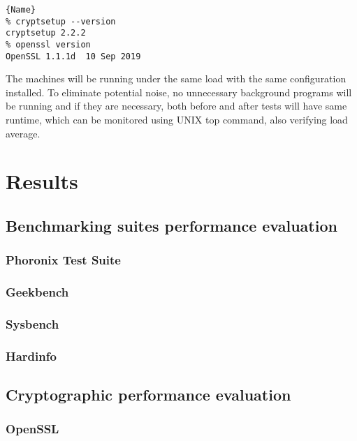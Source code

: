 \documentclass{csfourzero}
\begin{document}
\begin{lstlisting}[caption=Versions of crypsetup and openssl, frame=tlrb, basicstyle=\small]{Name}
% cryptsetup --version
cryptsetup 2.2.2
% openssl version     
OpenSSL 1.1.1d  10 Sep 2019
\end{lstlisting}

The machines will be running under the same load with the same configuration installed. To eliminate potential noise, no unnecessary background programs will be running and if they are necessary, both before and after tests will have same runtime, which can be monitored using UNIX top command, also verifying load average.



\section{Results}
\label{sec:results}

\subsection{Benchmarking suites performance evaluation}

\subsubsection{Phoronix Test Suite}

\subsubsection{Geekbench}

\subsubsection{Sysbench}

\subsubsection{Hardinfo}

\subsection{Cryptographic performance evaluation}

\subsubsection{OpenSSL}
\end{document}
